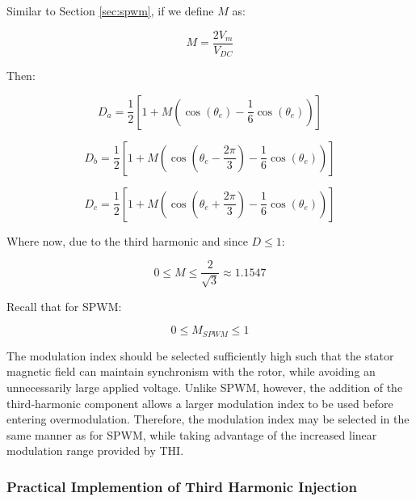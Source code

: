 \documentclass{article}
\begin{document}
Similar to Section \ref{sec:spwm}, if we define $M$ as:

\begin{equation}
    M = \frac{2V_m}{V_{DC}}
\end{equation}

Then:

\begin{equation}
    D_a = \frac{1}{2}\left[1 + M\left(\cos(\theta_e) - \frac{1}{6}\cos(\theta_e)\right)\right]
\end{equation}

\begin{equation}
    D_b = \frac{1}{2}\left[1 + M\left(\cos(\theta_e - \frac{2\pi}{3}) - \frac{1}{6}\cos(\theta_e)\right)\right]
\end{equation}

\begin{equation}
    D_c = \frac{1}{2}\left[1 + M\left(\cos(\theta_e + \frac{2\pi}{3}) - \frac{1}{6}\cos(\theta_e)\right)\right]
\end{equation}

Where now, due to the third harmonic and since $D \leq 1$:

\begin{equation}
    0 \leq M \leq \frac{2}{\sqrt{3}} \approx 1.1547
\end{equation}

Recall that for SPWM:

\begin{equation}
    0 \leq M_{SPWM} \leq 1
\end{equation}

The modulation index should be selected sufficiently high such that the stator magnetic field can maintain synchronism with the rotor, while avoiding an unnecessarily large applied voltage. Unlike SPWM, however, the addition of the third-harmonic component allows a larger modulation index to be used before entering overmodulation. Therefore, the modulation index may be selected in the same manner as for SPWM, while taking advantage of the increased linear modulation range provided by THI.


\subsubsection{Practical Implemention of Third Harmonic Injection}
\end{document}
